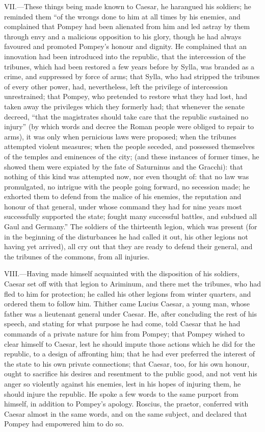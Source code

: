 VII.—These things being made known to Caesar, he harangued his
soldiers; he reminded them ``of the wrongs done to him at all times by
his enemies, and complained that Pompey had been alienated from him and
led astray by them through envy and a malicious opposition to his glory,
though he had always favoured and promoted Pompey's honour and dignity.
He complained that an innovation had been introduced into the republic,
that the intercession of the tribunes, which had been restored a few
years before by Sylla, was branded as a crime, and suppressed by force
of arms; that Sylla, who had stripped the tribunes of every other power,
had, nevertheless, left the privilege of intercession unrestrained; that
Pompey, who pretended to restore what they had lost, had taken away the
privileges which they formerly had; that whenever the senate decreed,
``that the magistrates should take care that the republic sustained no
injury'' (by which words and decree the Roman people were obliged to
repair to arms), it was only when pernicious laws were proposed; when
the tribunes attempted violent measures; when the people seceded, and
possessed themselves of the temples and eminences of the city; (and
these instances of former times, he showed them were expiated by the
fate of Saturninus and the Gracchi): that nothing of this kind was
attempted now, nor even thought of: that no law was promulgated, no
intrigue with the people going forward, no secession made; he exhorted
them to defend from the malice of his enemies, the reputation and honour
of that general, under whose command they had for nine years most
successfully supported the state; fought many successful battles, and
subdued all Gaul and Germany.'' The soldiers of the thirteenth legion,
which was present (for in the beginning of the disturbances he had
called it out, his other legions not having yet arrived), all cry out
that they are ready to defend their general, and the tribunes of the
commons, from all injuries.

VIII.—Having made himself acquainted with the disposition of his
soldiers, Caesar set off with that legion to Ariminum, and there met the
tribunes, who had fled to him for protection; he called his other
legions from winter quarters, and ordered them to follow him. Thither
came Lucius Caesar, a young man, whose father was a lieutenant general
under Caesar. He, after concluding the rest of his speech, and stating
for what purpose he had come, told Caesar that he had commands of a
private nature for him from Pompey; that Pompey wished to clear himself
to Caesar, lest he should impute those actions which he did for the
republic, to a design of affronting him; that he had ever preferred the
interest of the state to his own private connections; that Caesar, too,
for his own honour, ought to sacrifice his desires and resentment to the
public good, and not vent his anger so violently against his enemies,
lest in his hopes of injuring them, he should injure the republic. He
spoke a few words to the same purport from himself, in addition to
Pompey's apology. Roscius, the praetor, conferred with Caesar almost in
the same words, and on the same subject, and declared that Pompey had
empowered him to do so.

